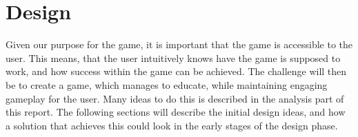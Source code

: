 \chapter{Design}
\label{cha:design}

Given our purpose for the game, it is important that the game is accessible to the user.
This means, that the user intuitively knows have the game is supposed to work, and how success within the game can be achieved.
The challenge will then be to create a game, which manages to educate, while maintaining engaging gameplay for the user.
Many ideas to do this is described in the analysis part of this report.
The following sections will describe the initial design ideas, and how a solution that achieves this could look in the early stages of the design phase.




